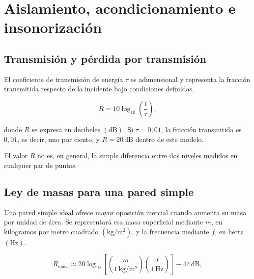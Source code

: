 \section{Aislamiento, acondicionamiento e insonorización}
\label{sec:u9-aislamiento}

\subsection{Transmisión y pérdida por transmisión}
\label{sec:u9-perdida-transmision}

El coeficiente de transmisión de energía \(\tau\) es adimensional y representa
la fracción transmitida respecto de la incidente bajo condiciones definidas.

\begin{equation}
    R=10\log_{10}\!\left(\frac{1}{\tau}\right),
    \label{eq:u9-reduccion-transmision}
\end{equation}

donde \(R\) se expresa en decibeles \((\text{dB})\). Si
\(\tau=0{,}01\), la fracción transmitida es \(0{,}01\), es decir, uno por
ciento, y
\(R=20\,\text{dB}\) dentro de este modelo.

El valor \(R\) no es, en general, la simple diferencia entre dos niveles
medidos en cualquier par de puntos. 

\subsection{Ley de masas para una pared simple}
\label{sec:u9-ley-masas}

Una pared simple ideal ofrece mayor oposición inercial cuando aumenta su masa
por unidad de área. Se representará esa masa superficial mediante \(m\), en
kilogramos por metro cuadrado \((\text{kg}/\text{m}^2)\), y la frecuencia
mediante \(f\), en hertz \((\text{Hz})\).


\begin{equation}
    R_\mathrm{masa}
      \approx
      20\log_{10}\!\left[
        \left(\frac{m}{1\,\text{kg}/\text{m}^2}\right)
        \left(\frac{f}{1\,\text{Hz}}\right)
      \right]
      -47\,\text{dB},
    \label{eq:u9-ley-masas}
\end{equation}

